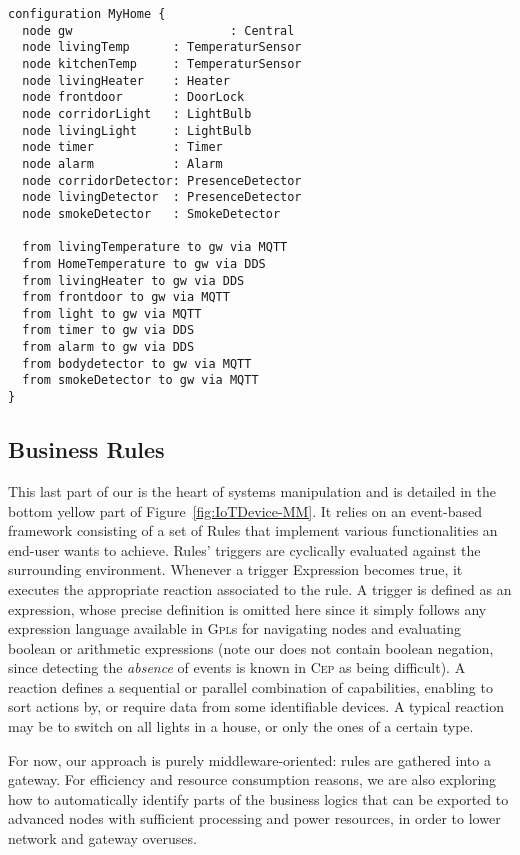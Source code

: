 \begin{lstlisting}[label=lis:RE-Network,language=iotdsl,caption=Network Configuration for Alice's House]	
configuration MyHome {
  node gw 					   : Central
  node livingTemp      : TemperaturSensor
  node kitchenTemp     : TemperaturSensor
  node livingHeater    : Heater
  node frontdoor       : DoorLock
  node corridorLight   : LightBulb
  node livingLight     : LightBulb
  node timer           : Timer
  node alarm           : Alarm
  node corridorDetector: PresenceDetector
  node livingDetector  : PresenceDetector
  node smokeDetector   : SmokeDetector
  
  from livingTemperature to gw via MQTT
  from HomeTemperature to gw via DDS
  from livingHeater to gw via DDS
  from frontdoor to gw via MQTT
  from light to gw via MQTT
  from timer to gw via DDS
  from alarm to gw via DDS
  from bodydetector to gw via MQTT
  from smokeDetector to gw via MQTT
}
\end{lstlisting}

\subsection{Business Rules}
\label{sec:IoTDSL-BusinessRules}

This last part of our \DSL is the heart of \IOT systems manipulation and is detailed in the bottom yellow part of Figure~\ref{fig:IoTDevice-MM}. It relies on an event-based framework consisting of a set of \textsf{Rule}s that implement various functionalities an end-user wants to achieve. Rules' \textsf{trigger}s are cyclically evaluated against the surrounding environment. Whenever a \textsf{trigger} \textsf{Expression} becomes true, it executes the appropriate \textsf{reaction} associated to the rule. A \textsf{trigger} is defined as an expression, whose precise definition is omitted here since it simply follows any expression language available in \textsc{Gpl}s for navigating nodes and evaluating boolean or arithmetic expressions (note our \DSL does not contain boolean negation, since detecting the \emph{absence} of events is known in \textsc{Cep} as being difficult). A \textsf{reaction} defines a sequential or parallel combination of capabilities, enabling to sort actions by, or require data from some identifiable devices. A typical \textsf{reaction} may be to switch on all lights in a house, or only the ones of a certain type.

For now, our approach is purely middleware-oriented: rules are gathered into a gateway. For efficiency and resource consumption reasons, we are also exploring how to automatically identify parts of the business logics that can be exported to advanced nodes with sufficient processing and power resources, in order to lower network and gateway overuses.

